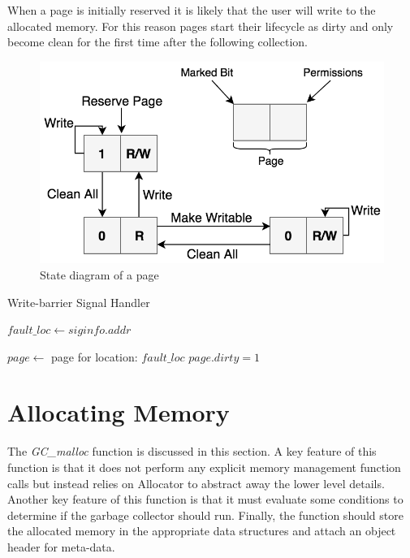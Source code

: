 \documentclass[../diss.tex]{subfiles}
\begin{document}
When a page is initially reserved it is likely that the user will write to the allocated memory. For this reason pages start their lifecycle as dirty and only become clean for the first time after the following collection. 

\begin{figure}
    \centering
    \includegraphics[max width=\linewidth]{figs/page_lifecycle.png}
    \caption{State diagram of a page}
    \label{fig:page_lifecycle}
\end{figure}

\begin{algorithm}
\caption{Write-barrier Signal Handler}
\label{alg:wbsignal}
\begin{algorithmic}


\State \Return
\EndIf

\State $\mathit{fault\_loc}\gets \mathit{siginfo}.addr$

\State $page\gets$ page for location: $\mathit{fault\_loc}$
\State $page.dirty = 1$
\State {}

\EndFunction

\end{algorithmic}
\end{algorithm}


\section{Allocating Memory}
\label{sec:gcmalloc}

The \emph{GC\_malloc} function is discussed in this section. A key feature of this function is that it does not perform any explicit memory management function calls but instead relies on Allocator to abstract away the lower level details. Another key feature of this function is that it must evaluate some conditions to determine if the garbage collector should run. Finally, the function should store the allocated memory in the appropriate data structures and attach an object header for meta-data.
\end{document}
